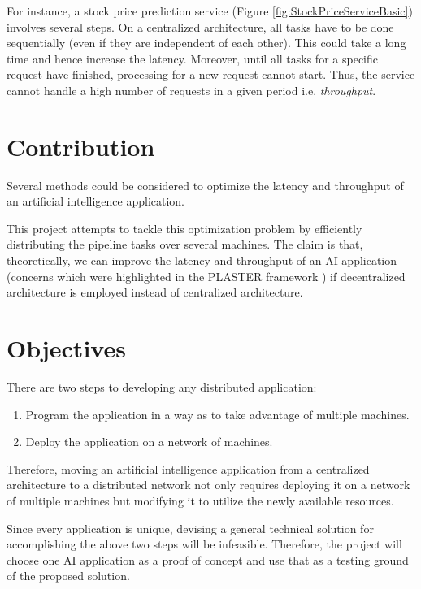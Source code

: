 \documentclass{report}
\begin{document}
For instance, a stock price prediction service (Figure \ref{fig:StockPriceServiceBasic}) involves several steps. On a centralized architecture, all tasks have to be done sequentially (even if they are independent of each other). This could take a long time and hence increase the latency. Moreover, until all tasks for a specific request have finished, processing for a new request cannot start. Thus, the service cannot handle a high number of requests in a given period i.e. \textit{throughput}.

\section{Contribution}

Several methods could be considered to optimize the latency and throughput of an artificial intelligence application.

This project attempts to tackle this optimization problem by efficiently distributing the pipeline tasks over several machines. The claim is that, theoretically, we can improve the latency and throughput of an AI application (concerns which were highlighted in the PLASTER framework \cite{Teich2018}) if decentralized architecture is employed instead of centralized architecture.

\section{Objectives}\label{objectives}

There are two steps to developing any distributed application:
\begin{enumerate}
  \item Program the application in a way as to take advantage of multiple machines.
  \item Deploy the application on a network of machines.
\end{enumerate}

Therefore, moving an artificial intelligence application from a centralized architecture to a distributed network not only requires deploying it on a network of multiple machines but modifying it to utilize the newly available resources.

Since every application is unique, devising a general technical solution for accomplishing the above two steps will be infeasible. Therefore, the project will choose one AI application as a proof of concept and use that as a testing ground of the proposed solution.
\end{document}
